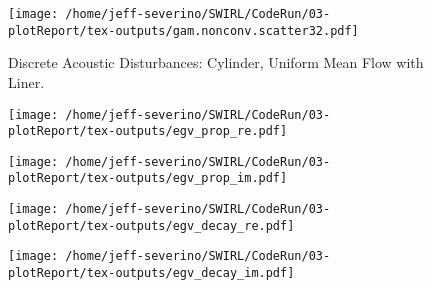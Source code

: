 \documentclass{article}
\begin{document}
 \begin{figure}
     \centering
     \texttt{[image: /home/jeff-severino/SWIRL/CodeRun/03-plotReport/tex-outputs/gam.nonconv.scatter32.pdf]}
     \caption{Discrete Acoustic Disturbances: Cylinder, Uniform Mean Flow with Liner.}
 \end{figure}
 
 


 \begin{figure}
     \centering
     \texttt{[image: /home/jeff-severino/SWIRL/CodeRun/03-plotReport/tex-outputs/egv\_prop\_re.pdf]}
 \end{figure}

 \begin{figure}
     \centering
     \texttt{[image: /home/jeff-severino/SWIRL/CodeRun/03-plotReport/tex-outputs/egv\_prop\_im.pdf]}
 \end{figure}

 \begin{figure}
     \centering
     \texttt{[image: /home/jeff-severino/SWIRL/CodeRun/03-plotReport/tex-outputs/egv\_decay\_re.pdf]}
 \end{figure}

 \begin{figure}
     \centering
     \texttt{[image: /home/jeff-severino/SWIRL/CodeRun/03-plotReport/tex-outputs/egv\_decay\_im.pdf]}
 \end{figure}





\end{document}
